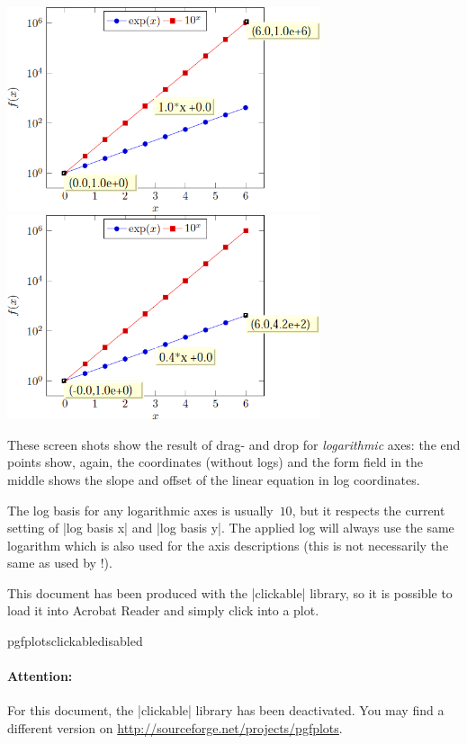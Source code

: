     \includegraphics[height=6cm]{figures/pgfplotsclickable-fig4.png}
    \includegraphics[height=6cm]{figures/pgfplotsclickable-fig3.png}

\nobreak These screen shots show the result of drag- and drop for
\emph{logarithmic} axes: the end points show, again, the coordinates (without
logs) and the form field in the middle shows the slope and offset of the linear
equation in log coordinates.

The log basis for any logarithmic axes is usually~$10$, but it respects the
current setting of |log basis x| and |log basis y|. The applied log will always
use the same logarithm which is also used for the axis descriptions (this is
not necessarily the same as used by \PGFPlotstable!).

This document has been produced with the |clickable| library, so it is possible
to load it into Acrobat Reader and simply click into a plot.

    \expandafter\ifx\csname pgfplotsclickabledisabled\endcsname\relax
    \else
    \paragraph{Attention:}
    For this document, the |clickable| library has been deactivated. You may
    find a different version on \url{http://sourceforge.net/projects/pgfplots}.
    \fi

